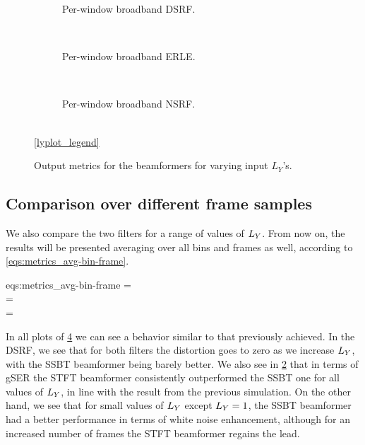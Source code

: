 \begin{figure}[!ht]
	\centering
	\begin{subfigure}{\textwidth}
			\centering
			
			\caption{Per-window broadband DSRF.}
			\label{subfig:lineplot__DSRF__iSER_n15__Ly_var__err_0}
		\end{subfigure}\\[1em]
	\begin{subfigure}{\textwidth}
			\centering
			
			\caption{Per-window broadband ERLE.}
			\label{subfig:lineplot__gSER__iSER_n15__Ly_var__err_0}
		\end{subfigure}\\[1em]
	\begin{subfigure}{\textwidth}
			\centering
			
			\caption{Per-window broadband NSRF.}
			\label{subfig:lineplot__gSNR__iSER_n15__Ly_var__err_0}
		\end{subfigure}\\[1em]
	\ref*{lyplot_legend}
	\caption{Output metrics for the beamformers for varying input $L_Y$'s.}
	\label{fig:lineplot__iSER_n15__Ly_var__err_0}
\end{figure}

\subsection{Comparison over different frame samples}

We also compare the two filters for a range of values of $\Ly$. From now on, the results will be presented averaging over all bins and frames as well, according to \cref{eqs:metrics_avg-bin-frame}.
\begin{subgather}{eqs:metrics_avg-bin-frame}
	\dsrf =  \\
	\gser =  \cdot {} \\
	\gsnr =  \cdot {}
\end{subgather}

In all plots of \cref{fig:lineplot__iSER_n15__Ly_var__err_0} we can see a behavior similar to that previously achieved. In the DSRF, we see that for both filters the distortion goes to zero as we increase $\Ly$, with the SSBT beamformer being barely better. We also see in \cref{subfig:lineplot__gSER__iSER_n15__Ly_var__err_0} that in terms of gSER the STFT beamformer consistently outperformed the SSBT one for all values of $\Ly$, in line with the result from the previous simulation. On the other hand, we see that for small values of $\Ly$ except $\Ly = 1$, the SSBT beamformer had a better performance in terms of white noise enhancement, although for an increased number of frames the STFT beamformer regains the lead.

